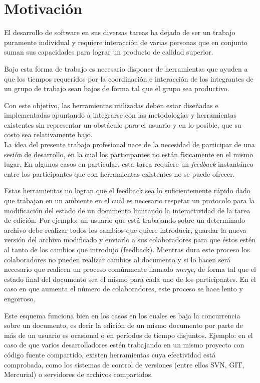 \documentclass[12pt,a4paper]{article}
\let\stdsection\section
\renewcommand\section{\newpage\stdsection}
\begin{document}
	\section{Motivación}
El desarrollo de software en sus diversas tareas ha dejado de ser un trabajo 
puramente individual y requiere interacción de varias personas que en conjunto 
suman sus capacidades para lograr un producto de calidad superior.

Bajo esta forma de trabajo es necesario disponer de herramientas que ayuden a que los tiempos
requeridos por la coordinación e interacción de los integrantes de un grupo de trabajo sean bajos
de forma tal que el grupo sea productivo.

Con este objetivo, las herramientas utilizadas deben estar diseñadas e implementadas apuntando a
integrarse con las metodologías y herramientas existentes sin representar un obstáculo para el usuario
y en lo posible, que su costo sea relativamente bajo. \\

La idea del presente trabajo profesional nace de la necesidad de participar de una sesión de desarrollo,
en la cual los participantes no están físicamente en el mismo lugar. En algunos casos en particular,
esta tarea requiere un \textit{feedback} instantáneo entre los participantes que con herramientas
existentes no se puede ofrecer.

Estas herramientas no logran que el feedback sea lo suficientemente rápido dado que trabajan
en un ambiente en el cual es necesario respetar un protocolo para la modificación del estado de un 
documento limitando la interactividad de la tarea de edición. Por ejemplo: un usuario que está trabajando
sobre un determinado archivo debe realizar todos los cambios que quiere introducir, guardar la
nueva versión del archivo modificado y enviarlo a sus colaboradores para que éstos estén al tanto de los 
cambios que introdujo (feedback). Mientras dura este proceso los colaboradores no pueden realizar cambios 
al documento y si lo hacen será necesario que realicen un proceso comúnmente llamado \textit{merge}, de forma
tal que el estado final del documento sea el mismo para cada uno de los participantes. 
En el caso en que aumenta el número de colaboradores, este proceso se hace lento y engorroso.

Este esquema funciona bien en los casos en los cuales es baja la concurrencia sobre un documento,
es decir la edición de un mismo documento por parte de más de un usuario es ocasional o en períodos de
tiempo disjuntos. Ejemplo: en el caso de que varios desarrolladores estén trabajando en un mismo proyecto 
con código fuente compartido, existen herramientas cuya efectividad está comprobada, como los sistemas de control
de versiones (entre ellos SVN, GIT, Mercurial) o servidores de archivos compartidos. \\
\end{document}
